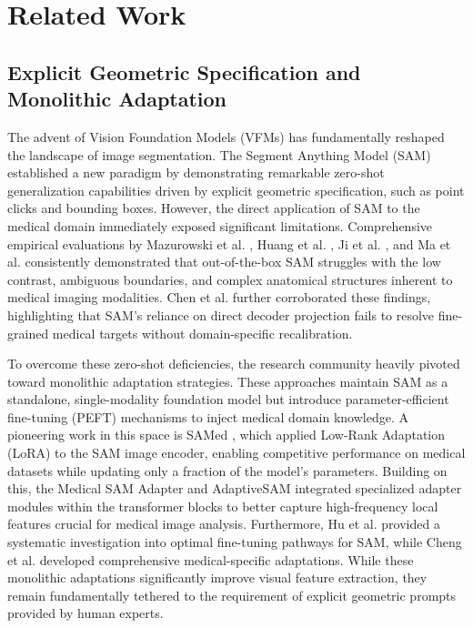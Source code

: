 \documentclass[onecolumn]{IEEEtran}
\numberwithin{equation}{section}
\theoremstyle{definition}
\theoremstyle{remark}
\begin{document}
\section{Related Work}

\subsection{Explicit Geometric Specification and Monolithic Adaptation}

The advent of Vision Foundation Models (VFMs) has fundamentally reshaped the landscape of image segmentation. The Segment Anything Model (SAM) \cite{kirillov2023segment} established a new paradigm by demonstrating remarkable zero-shot generalization capabilities driven by explicit geometric specification, such as point clicks and bounding boxes. However, the direct application of SAM to the medical domain immediately exposed significant limitations. Comprehensive empirical evaluations by Mazurowski et al. \cite{mazurowski2023segment}, Huang et al. \cite{huang2024segment}, Ji et al. \cite{ji2024segment}, and Ma et al. \cite{ma2024segment} consistently demonstrated that out-of-the-box SAM struggles with the low contrast, ambiguous boundaries, and complex anatomical structures inherent to medical imaging modalities. Chen et al. \cite{chen2023sam} further corroborated these findings, highlighting that SAM's reliance on direct decoder projection fails to resolve fine-grained medical targets without domain-specific recalibration.

To overcome these zero-shot deficiencies, the research community heavily pivoted toward monolithic adaptation strategies. These approaches maintain SAM as a standalone, single-modality foundation model but introduce parameter-efficient fine-tuning (PEFT) mechanisms to inject medical domain knowledge. A pioneering work in this space is SAMed \cite{zhang2023customized}, which applied Low-Rank Adaptation (LoRA) to the SAM image encoder, enabling competitive performance on medical datasets while updating only a fraction of the model's parameters. Building on this, the Medical SAM Adapter \cite{wu2025medical} and AdaptiveSAM \cite{paranjape2023adaptivesam} integrated specialized adapter modules within the transformer blocks to better capture high-frequency local features crucial for medical image analysis. Furthermore, Hu et al. \cite{hu2023how} provided a systematic investigation into optimal fine-tuning pathways for SAM, while Cheng et al. \cite{cheng2023sam} developed comprehensive medical-specific adaptations. While these monolithic adaptations significantly improve visual feature extraction, they remain fundamentally tethered to the requirement of explicit geometric prompts provided by human experts.
\end{document}
